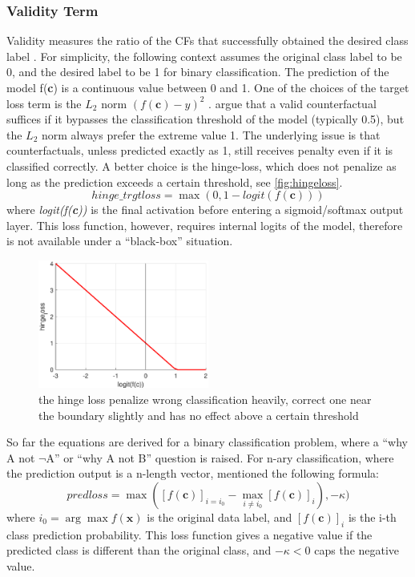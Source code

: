 \subsubsection{Validity Term} Validity measures the ratio of the CFs that successfully obtained the desired class label \cite{CFReview}. For simplicity, the following context assumes the original class label to be 0, and the desired label to be 1 for binary classification. The prediction of the model f(\textbf{c}) is a continuous value between 0 and 1. One of the choices of the target loss term is the \emph{$L_2$} norm $(f(\textbf{c})-y)^2$ \cite{watcher2017}. \citeauthor{DiCE} \cite{DiCE} argue that a valid counterfactual suffices if it bypasses the classification threshold of the model (typically 0.5), but the \emph{$L_2$} norm always prefer the extreme value 1. The underlying issue is that counterfactuals, unless predicted exactly as 1, still receives penalty even if it is classified correctly. A better choice is the hinge-loss, which does not penalize as long as the prediction exceeds a certain threshold, see \autoref{fig:hingeloss}.
\begin{equation}\label{eq:hingeloss}
  hinge\_trgtloss=\max(0,1-logit(f(\textbf{c})))
\end{equation}
where \emph{logit(f(\textbf{c}))} is the final activation before entering a sigmoid/softmax output layer. This loss function, however, requires internal logits of the model, therefore is not available under a ``black-box'' situation.
\begin{figure}
  \centering
  \includegraphics[width=0.5\textwidth]{hingeloss.eps}
  \caption{the hinge loss penalize wrong classification heavily, correct one near the boundary slightly and has no effect above a certain threshold}\label{fig:hingeloss}
\end{figure}

So far the equations are derived for a binary classification problem, where a ``why A not $\neg${A}'' or ``why A not B'' question is raised. For n-ary classification, where the prediction output is a n-length vector, \citeauthor{prototype} \cite{prototype} mentioned the following formula:
\begin{equation}\label{eq:lossPred}
  predloss=\max([f(\textbf{c})]_{i=i_0}-\max_{i\neq i_0}[f(\textbf{c})]_i),-\kappa)
\end{equation}
where $i_0=\arg\max f(\textbf{x})$ is the original data label, and $[f(\textbf{c})]_i$ is the i-th class prediction probability. This loss function gives a negative value if the predicted class is different than the original class, and $-\kappa < 0$ caps the negative value.

